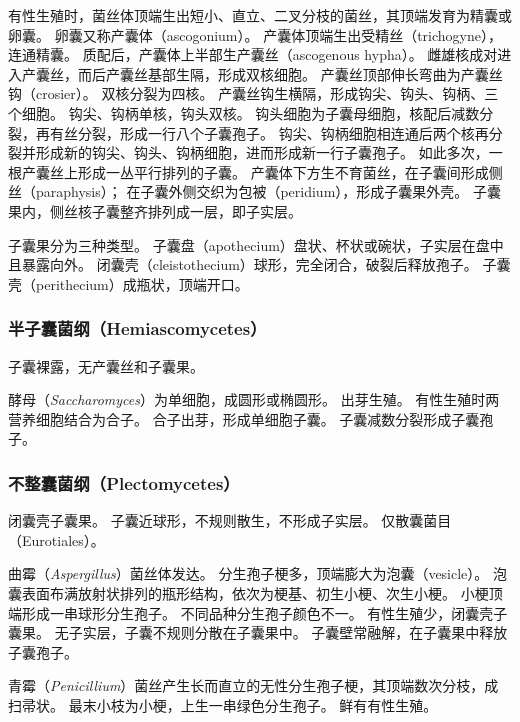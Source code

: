 \documentclass[11pt]{article}
\begin{document}
有性生殖时，菌丝体顶端生出短小、直立、二叉分枝的菌丝，其顶端发育为精囊或卵囊。
卵囊又称产囊体（ascogonium）。
产囊体顶端生出受精丝（trichogyne），连通精囊。
质配后，产囊体上半部生产囊丝（ascogenous hypha）。
雌雄核成对进入产囊丝，而后产囊丝基部生隔，形成双核细胞。
产囊丝顶部伸长弯曲为产囊丝钩（crosier）。
双核分裂为四核。
产囊丝钩生横隔，形成钩尖、钩头、钩柄、三个细胞。
钩尖、钩柄单核，钩头双核。
钩头细胞为子囊母细胞，核配后减数分裂，再有丝分裂，形成一行八个子囊孢子。
钩尖、钩柄细胞相连通后两个核再分裂并形成新的钩尖、钩头、钩柄细胞，进而形成新一行子囊孢子。
如此多次，一根产囊丝上形成一丛平行排列的子囊。
产囊体下方生不育菌丝，在子囊间形成侧丝（paraphysis）；
在子囊外侧交织为包被（peridium），形成子囊果外壳。
子囊果内，侧丝核子囊整齐排列成一层，即子实层。

\par

子囊果分为三种类型。
子囊盘（apothecium）盘状、杯状或碗状，子实层在盘中且暴露向外。
闭囊壳（cleistothecium）球形，完全闭合，破裂后释放孢子。
子囊壳（perithecium）成瓶状，顶端开口。

\subsubsection{半子囊菌纲（Hemiascomycetes）}
子囊裸露，无产囊丝和子囊果。

\par

酵母（\textit{Saccharomyces}）为单细胞，成圆形或椭圆形。
出芽生殖。
有性生殖时两营养细胞结合为合子。
合子出芽，形成单细胞子囊。
子囊减数分裂形成子囊孢子。

\subsubsection{不整囊菌纲（Plectomycetes）}
闭囊壳子囊果。
子囊近球形，不规则散生，不形成子实层。
仅散囊菌目（Eurotiales）。

\par

曲霉（\textit{Aspergillus}）菌丝体发达。
分生孢子梗多，顶端膨大为泡囊（vesicle）。
泡囊表面布满放射状排列的瓶形结构，依次为梗基、初生小梗、次生小梗。
小梗顶端形成一串球形分生孢子。
不同品种分生孢子颜色不一。
有性生殖少，闭囊壳子囊果。
无子实层，子囊不规则分散在子囊果中。
子囊壁常融解，在子囊果中释放子囊孢子。

\par

青霉（\textit{Penicillium}）菌丝产生长而直立的无性分生孢子梗，其顶端数次分枝，成扫帚状。
最末小枝为小梗，上生一串绿色分生孢子。
鲜有有性生殖。
\end{document}
